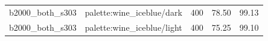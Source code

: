 \begin{longtable}{l>{\raggedright\arraybackslash}p{.42\linewidth}rrr}
b2000\_\allowbreak{}both\_\allowbreak{}s303 & %
palette:wine\_\allowbreak{}iceblue/dark & %
400 & %
78.50 & %
99.13 \\ %

b2000\_\allowbreak{}both\_\allowbreak{}s303 & %
palette:wine\_\allowbreak{}iceblue/light & %
400 & %
75.25 & %
99.10 \\ %


\end{longtable}

